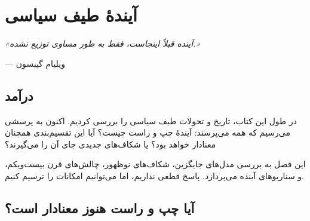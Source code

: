 \chapter{آیندهٔ طیف سیاسی}

\begin{tcolorbox}[
    enhanced,
    colback=VeryLightGray, %
    colframe=DarkGray, %
    boxrule=2pt,
    arc=8pt,
    fonttitle=\bfseries\large,
    title={\rl{نقل\'قول آغازین}},
    attach boxed title to top center={yshift=-3mm},
    boxed title style={colback=DarkGray, colframe=DarkGray} %
]
\begin{center}
\Large\textit{«آینده قبلاً اینجاست، فقط به طور مساوی توزیع نشده.»}

\vspace{3mm}
\normalsize
--- ویلیام گیبسون
\end{center}
\end{tcolorbox}

\vspace{5mm}

\section*{درآمد}


در طول این کتاب، تاریخ و تحولات طیف سیاسی را بررسی کردیم. اکنون به پرسشی می‌رسیم که همه می‌پرسند: آیندهٔ چپ و راست چیست؟ آیا این تقسیم‌بندی همچنان معنادار خواهد بود؟ یا شکاف‌های جدیدی جای آن را می‌گیرند؟

این فصل به بررسی مدل‌های جایگزین، شکاف‌های نوظهور، چالش‌های قرن بیست‌ویکم، و سناریوهای آینده می‌پردازد. پاسخ قطعی نداریم، اما می‌توانیم امکانات را ترسیم کنیم.


\section{آیا چپ و راست هنوز معنادار است؟}

